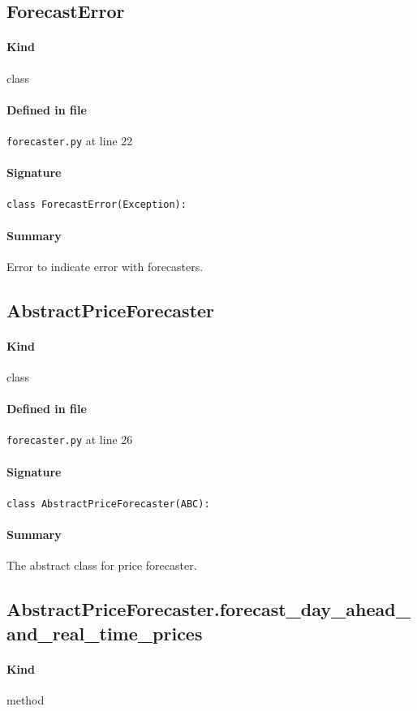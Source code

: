 \documentclass[11pt]{report}
\begin{document}
\subsection{ForecastError}
\label{def:forecaster.py:ForecastError:L22}
\paragraph{Kind} class
\paragraph{Defined in file} \texttt{forecaster.py} at line 22
\paragraph{Signature} \texttt{class ForecastError(Exception):}
\paragraph{Summary} Error to indicate error with forecasters.
\subsection{AbstractPriceForecaster}
\label{def:forecaster.py:AbstractPriceForecaster:L26}
\paragraph{Kind} class
\paragraph{Defined in file} \texttt{forecaster.py} at line 26
\paragraph{Signature} \texttt{class AbstractPriceForecaster(ABC):}
\paragraph{Summary} The abstract class for price forecaster.
\subsection{AbstractPriceForecaster.forecast\_day\_ahead\_and\_real\_time\_prices}
\label{def:forecaster.py:AbstractPriceForecaster.forecast_day_ahead_and_real_time_prices:L32}
\paragraph{Kind} method
\end{document}
